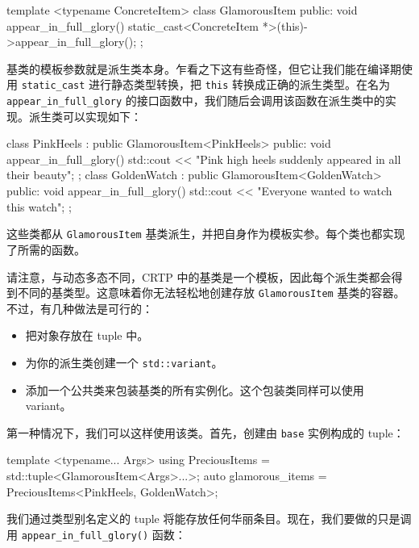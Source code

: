 \begin{codebox}[cpp]
template <typename ConcreteItem> class GlamorousItem {
public:
    void appear_in_full_glory() {
        static_cast<ConcreteItem *>(this)->appear_in_full_glory();
    }
};
\end{codebox}

基类的模板参数就是派生类本身。乍看之下这有些奇怪，但它让我们能在编译期使用 \texttt{static\_\allowbreak{}cast} 进行静态类型转换，把 \texttt{this} 转换成正确的派生类型。在名为 \texttt{appear\_\allowbreak{}in\_\allowbreak{}full\_\allowbreak{}glory} 的接口函数中，我们随后会调用该函数在派生类中的实现。派生类可以实现如下：

\begin{codebox}[cpp]
class PinkHeels : public GlamorousItem<PinkHeels> {
public:
    void appear_in_full_glory() {
        std::cout << "Pink high heels suddenly appeared in all their beauty\n";
    }
};
class GoldenWatch : public GlamorousItem<GoldenWatch> {
public:
    void appear_in_full_glory() {
        std::cout << "Everyone wanted to watch this watch\n";
    }
};
\end{codebox}

\label{idx:552}
这些类都从 \texttt{Glamorous\allowbreak{}Item} 基类派生，并把自身作为模板实参。每个类也都实现了所需的函数。

请注意，与动态多态不同，CRTP 中的基类是一个模板，因此每个派生类都会得到不同的基类型。这意味着你无法轻松地创建存放 \texttt{Glamorous\allowbreak{}Item} 基类的容器。不过，有几种做法是可行的：

\begin{itemize}
\item 把对象存放在 tuple 中。
\item 为你的派生类创建一个 \texttt{std::\allowbreak{}variant}。
\item 添加一个公共类来包装基类的所有实例化。这个包装类同样可以使用 variant。
\end{itemize}

第一种情况下，我们可以这样使用该类。首先，创建由 \texttt{base} 实例构成的 tuple：

\begin{codebox}[cpp]
template <typename... Args>
using PreciousItems = std::tuple<GlamorousItem<Args>...>;
auto glamorous_items = PreciousItems<PinkHeels, GoldenWatch>{};
\end{codebox}

我们通过类型别名定义的 tuple 将能存放任何华丽条目。现在，我们要做的只是调用 \texttt{appear\_\allowbreak{}in\_\allowbreak{}full\_\allowbreak{}glory(\allowbreak{})\allowbreak{}} 函数：


